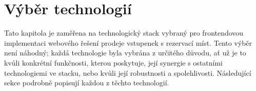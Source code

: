 \section{Výběr technologií}
\label{sec:implementace-technologie}
Tato kapitola je zaměřena na technologický stack vybraný pro frontendovou implementaci webového řešení prodeje vstupenek s rezervací míst.
Tento výběr není náhodný; každá technologie byla vybrána z určitého důvodu, ať už je to kvůli konkrétní funkčnosti, kterou poskytuje, její synergie s ostatními technologiemi ve stacku, nebo kvůli její robustnosti a spolehlivosti.
Následující sekce podrobně popisují každou z těchto technologií.

